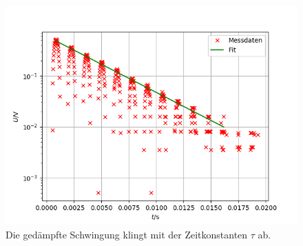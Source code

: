 \begin{figure}[h]
	\centering
	\includegraphics[width=\textwidth]{img/h.png}
	\caption{Die gedämpfte Schwingung klingt mit der Zeitkonstanten $\tau$ ab.}
	\label{h}
\end{figure}

\FloatBarrier
